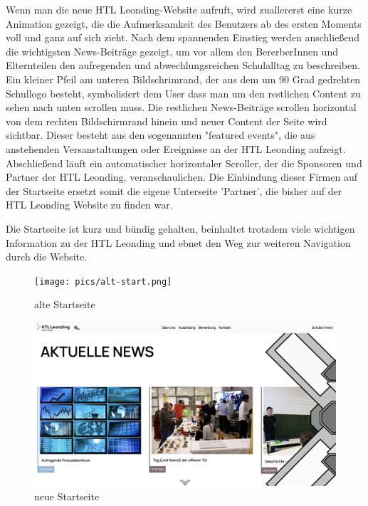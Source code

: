 Wenn man die neue HTL Leonding-Website aufruft, wird zuallererst eine kurze Animation gezeigt, die die Aufmerksamkeit des Benutzers ab des 
ersten Moments voll und ganz auf sich zieht. Nach dem spannenden Einstieg werden anschließend die wichtigsten News-Beiträge gezeigt, um vor allem
den BererberInnen und Elternteilen den aufregenden und abwechlungsreichen Schulalltag zu beschreiben. Ein kleiner Pfeil am unteren Bildschrimrand,
der aus dem um 90 Grad gedrehten Schullogo besteht, symbolisiert dem User dass man um den restlichen Content zu sehen nach unten scrollen muss. Die restlichen
News-Beiträge scrollen horizontal von dem rechten Bildschirmrand hinein und neuer Content der Seite wird sichtbar. Dieser besteht aus den sogenannten 
"featured events", die aus anstehenden Versanstaltungen oder Ereignisse an der HTL Leonding aufzeigt. 
Abschließend läuft ein automatischer horizontaler Scroller, der die Sponsoren und Partner der HTL Leonding, veranschaulichen. Die Einbindung dieser Firmen 
auf der Startseite ersetzt somit die eigene Unterseite 'Partner', die bisher auf der HTL Leonding Website zu finden war.

Die Startseite ist kurz und bündig gehalten, beinhaltet trotzdem viele wichtigen Information zu der HTL Leonding und ebnet den Weg zur weiteren Navigation
durch die Website.

\begin{figure}
   \begin{minipage}[b]{.4\linewidth} 
      \texttt{[image: pics/alt-start.png]}
      \caption{alte Startseite}
      \label{fig:impl:alt:start}
   \end{minipage}
   \hspace{.05\linewidth}
   \begin{minipage}[b]{.4\linewidth}
      \includegraphics[width=\linewidth]{pics/neu-start.png}
      \caption{neue Startseite}
      \label{fig:impl:neu:start}
   \end{minipage}
\end{figure}



